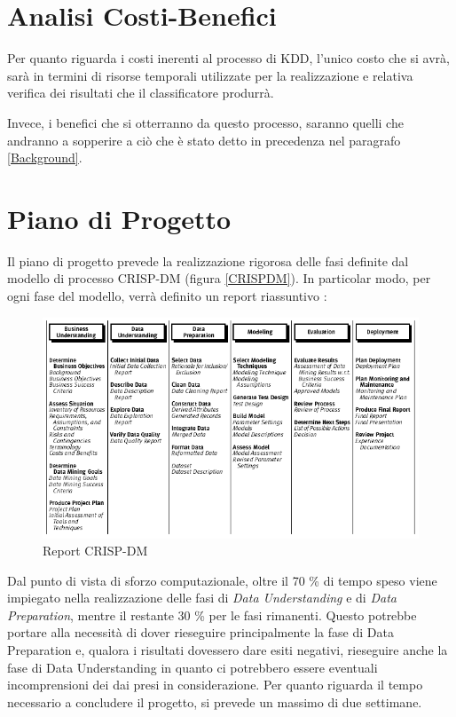 \section{Analisi Costi-Benefici}
Per quanto riguarda i costi inerenti al processo di KDD, l'unico costo che si avrà, sarà in termini di risorse temporali utilizzate per la realizzazione e relativa verifica dei risultati che il classificatore produrrà.

Invece, i benefici che si otterranno da questo processo, saranno quelli che andranno a sopperire a ciò che è stato detto in precedenza nel paragrafo \ref{Background}.

\section{Piano di Progetto}
Il piano di progetto prevede la realizzazione rigorosa delle fasi definite dal modello di processo CRISP-DM (figura \ref{CRISPDM}).
In particolar modo, per ogni fase del modello, verrà definito un report riassuntivo : 

\begin{figure}[hbtp]
	\centering
	\includegraphics[width=1\textwidth]{./images/Metodologia_CRISP_DM.png}
	\caption{Report CRISP-DM}
	\label{Report_CRISPDM}
\end{figure}

Dal punto di vista di sforzo computazionale, oltre il 70 \% di tempo speso viene impiegato nella realizzazione delle fasi di \textit{Data Understanding} e di \textit{Data Preparation}, mentre il restante 30 \% per le fasi rimanenti.
Questo potrebbe portare alla necessità di dover rieseguire principalmente la fase di Data Preparation e, qualora i risultati dovessero dare esiti negativi, rieseguire anche la fase di Data Understanding in quanto ci potrebbero essere eventuali incomprensioni dei dai presi in considerazione.
Per quanto riguarda il tempo necessario a concludere il progetto, si prevede un massimo di due settimane.